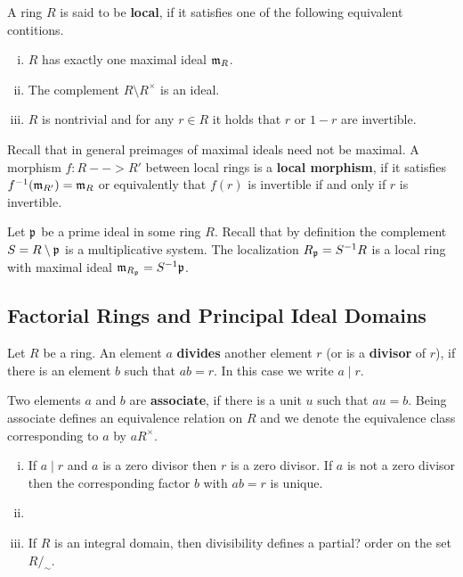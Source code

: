	\begin{definition}
		A ring $R$ is said to be \textbf{local}, if it satisfies one of the following equivalent contitions.
		\begin{enumerate}[(i)]
			\item{
				$R$ has exactly one maximal ideal $\mathfrak{m}_R$.
			}
			\item{
				The complement $R \setminus R^\times$ is an ideal.
			}
			\item{
				$R$ is nontrivial and for any $r \in R$ it holds that $r$ or $1-r$ are invertible.
			}
		\end{enumerate}

		Recall that in general preimages of maximal ideals need not be maximal. A morphism $f:R-->R'$ between local rings is a \textbf{local morphism}, if it satisfies $f^{-1}(\mathfrak{m}_{R'}) = \mathfrak{m}_R$ or equivalently that $f(r)$ is invertible if and only if $r$ is invertible.
	\end{definition}

	\begin{corollary}
		Let $\mathfrak{p}$ be a prime ideal in some ring $R$. Recall that by definition the complement $S = R\setminus \mathfrak{p}$ is a multiplicative system. The localization $R_{\mathfrak{p}} = S^{-1}R$ is a local ring with maximal ideal $\mathfrak{m}_{R_{\mathfrak{p}}} = S^{-1}\mathfrak{p}$.
	\end{corollary}

	\newpage
	\subsection{Factorial Rings and Principal Ideal Domains}

	\begin{definition}
		Let $R$ be a ring. An element $a$ \textbf{divides} another element $r$ (or is a \textbf{divisor} of $r$), if there is an element $b$ such that $ab = r$. In this case we write $a \mid r$.

		Two elements $a$ and $b$ are \textbf{associate}, if there is a unit $u$ such that $au = b$. Being associate defines an equivalence relation on $R$ and we denote the equivalence class corresponding to $a$ by $aR^\times$. 
	\end{definition}

	\begin{lemma}
		\begin{enumerate}[(i)]
			\item{
				If $a \mid r$ and $a$ is a zero divisor then $r$ is a zero divisor. If $a$ is not a zero divisor then the corresponding factor $b$ with $ab = r$ is unique.
			}
			\item{
			}
			\item{
				If $R$ is an integral domain, then divisibility defines a partial? order on the set $R/_\sim$.
			}
		\end{enumerate}
	\end{lemma}

